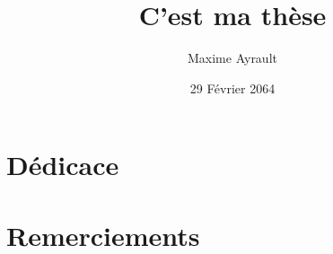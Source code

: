 \documentclass[20pt]{report}
\title{C'est ma th\`ese}
\author{Maxime Ayrault}
\date{29 F\'evrier 2064}
\begin{document}





\chapter*{D\'edicace}

\chapter*{Remerciements}

\tableofcontents

\listoffigures

\listoftables















\clearpage
\printglossary[type=\acronymtype]

\printglossary

\newpage
\printbibliography

\newpage
\appendix

\end{document}
